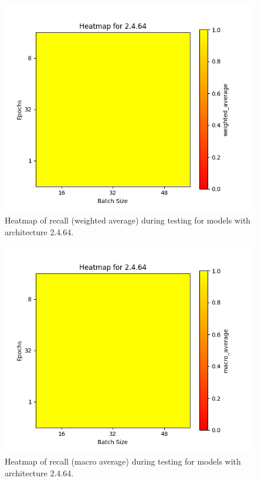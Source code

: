 \documentclass[12pt]{article}
\begin{document}
\begin{figure}[H]
\includegraphics[width=\textwidth]{heatmap_recall_weighted_average_2.4.64}
\centering
\caption{Heatmap of recall (weighted average) during testing for models with architecture 2.4.64.}
\label{fig:time-metrics}
\end{figure}

\begin{figure}[H]
\includegraphics[width=\textwidth]{heatmap_recall_macro_average_2.4.64}
\centering
\caption{Heatmap of recall (macro average) during testing for models with architecture 2.4.64.}
\label{fig:time-metrics}
\end{figure}
\end{document}
